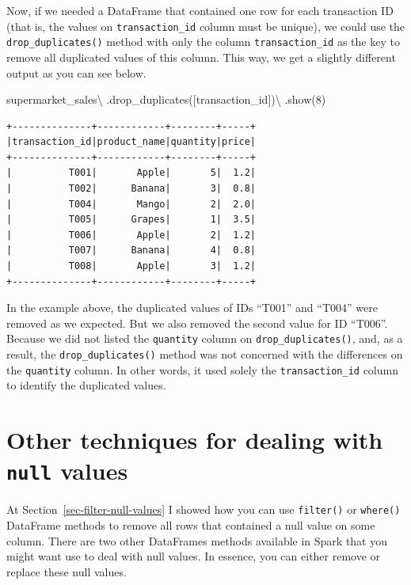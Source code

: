 \documentclass[
  11pt,
  letterpaper,
  DIV=11,
  numbers=noendperiod]{scrreprt}
\newenvironment{Shaded}{\begin{snugshade}}{\end{snugshade}}
\newcommand{\DecValTok}[1]{\textcolor[rgb]{0.68,0.00,0.00}{#1}}
\newcommand{\NormalTok}[1]{\textcolor[rgb]{0.00,0.23,0.31}{#1}}
\newcommand{\OperatorTok}[1]{\textcolor[rgb]{0.37,0.37,0.37}{#1}}
\newcommand{\StringTok}[1]{\textcolor[rgb]{0.13,0.47,0.30}{#1}}
\begin{document}
Now, if we needed a DataFrame that contained one row for each
transaction ID (that is, the values on \texttt{transaction\_id} column
must be unique), we could use the \texttt{drop\_duplicates()} method
with only the column \texttt{transaction\_id} as the key to remove all
duplicated values of this column. This way, we get a slightly different
output as you can see below.

\begin{Shaded}
\begin{Highlighting}[]
\NormalTok{supermarket\_sales}\OperatorTok{\textbackslash{}}
\NormalTok{    .drop\_duplicates([}\StringTok{\textquotesingle{}transaction\_id\textquotesingle{}}\NormalTok{])}\OperatorTok{\textbackslash{}}
\NormalTok{    .show(}\DecValTok{8}\NormalTok{)}
\end{Highlighting}
\end{Shaded}

\begin{verbatim}
+--------------+------------+--------+-----+
|transaction_id|product_name|quantity|price|
+--------------+------------+--------+-----+
|          T001|       Apple|       5|  1.2|
|          T002|      Banana|       3|  0.8|
|          T004|       Mango|       2|  2.0|
|          T005|      Grapes|       1|  3.5|
|          T006|       Apple|       2|  1.2|
|          T007|      Banana|       4|  0.8|
|          T008|       Apple|       3|  1.2|
+--------------+------------+--------+-----+
\end{verbatim}

In the example above, the duplicated values of IDs ``T001'' and ``T004''
were removed as we expected. But we also removed the second value for ID
``T006''. Because we did not listed the \texttt{quantity} column on
\texttt{drop\_duplicates()}, and, as a result, the
\texttt{drop\_duplicates()} method was not concerned with the
differences on the \texttt{quantity} column. In other words, it used
solely the \texttt{transaction\_id} column to identify the duplicated
values.

\hypertarget{other-techniques-for-dealing-with-null-values}{%
\section{\texorpdfstring{Other techniques for dealing with \texttt{null}
values}{Other techniques for dealing with null values}}\label{other-techniques-for-dealing-with-null-values}}

At Section~\ref{sec-filter-null-values} I showed how you can use
\texttt{filter()} or \texttt{where()} DataFrame methods to remove all
rows that contained a null value on some column. There are two other
DataFrames methods available in Spark that you might want use to deal
with null values. In essence, you can either remove or replace these
null values.
\end{document}
